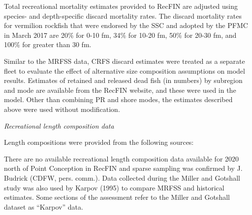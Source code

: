 \documentclass[11pt,
  english,
]{article}
\begin{document}
Total recreational mortality estimates provided to RecFIN are adjusted using species- and depth-specific discard mortality rates. The discard mortality rates for vermilion rockfish that were endorsed by the SSC and adopted by the PFMC in March 2017 are 20\% for 0-10 fm, 34\% for 10-20 fm, 50\% for 20-30 fm, and 100\% for greater than 30 fm.

Similar to the MRFSS data, CRFS discard estimates were treated as a separate fleet to evaluate the effect of alternative size composition assumptions on model results. Estimates of retained and released dead fish (in numbers) by subregion and mode are available from the RecFIN website, and these were used in the model. Other than combining PR and shore modes, the estimates described above were used without modification.

\emph{Recreational length composition data}

Length compositions were provided from the following sources:

There are no available recreational length composition data available for 2020 north of Point Conception in RecFIN and sparse sampling was confirmed by J. Budrick (CDFW, pers. comm.). Data collected during the Miller and Gotshall study was also used by Karpov (1995) to compare MRFSS and historical estimates. Some sections of the assessment refer to the Miller and Gotshall dataset as ``Karpov'' data.

\end{document}
